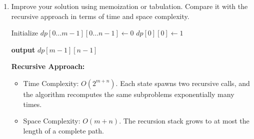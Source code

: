\documentclass[12pt,a4paper]{article}
\theoremstyle{definition}
\begin{document}
\begin{enumerate}
\begin{enumerate}
\begin{algorithm}[H]
                \Return $total$\;
            \Indm
            \BlankLine
            \textbf{output} $\CountPaths{0, 0}$\;
        \end{algorithm}
    
        \item Improve your solution using memoization or tabulation. Compare it with the recursive approach in terms of time and space complexity.

        \begin{algorithm}[H]
            \LinesNumbered
            \BlankLine
            \caption{Count Paths in Windy World (Tabulation)}
            \label{Algorithm: WindyWorldTabulation}
            
            Initialize $dp[0 \ldots m-1][0 \ldots n-1] \leftarrow 0$\;
            $dp[0][0] \leftarrow 1$\;
            
            
            \textbf{output} $dp[m-1][n-1]$\;
        \end{algorithm}

        \textbf{Recursive Approach:}
        \begin{itemize}
            \item Time Complexity: $O(2^{m+n})$. Each state spawns two recursive calls, and the algorithm recomputes the same subproblems exponentially many times.
            \item Space Complexity: $O(m+n)$. The recursion stack grows to at most the length of a complete path.
        \end{itemize}
        

\end{enumerate}
\end{enumerate}
\end{document}
